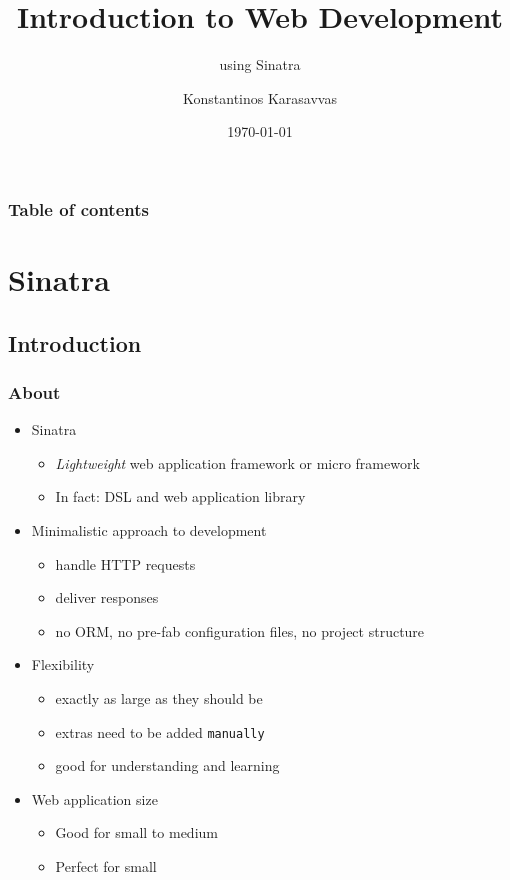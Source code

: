 \documentclass{beamer}
\begin{document}
\title{Introduction to Web Development}
\subtitle{using Sinatra}
\author[Konstantinos Karasavvas]{Konstantinos Karasavvas} %

\date{\today} 

\begin{frame}
  \titlepage
\end{frame}

\begin{frame}
\setcounter{tocdepth}{2}
\frametitle{Table of contents}
\tableofcontents
\end{frame} 





\section{Sinatra}

\subsection{Introduction} 
\begin{frame}\frametitle{About} 
  \begin{itemize}
    \item Sinatra 
    \begin{itemize}
      \item \textit{Lightweight} web application framework or micro framework
      \item In fact: DSL and web application library
    \end{itemize}

    \item Minimalistic approach to development
    \begin{itemize}
      \item handle HTTP requests
      \item deliver responses
      \item no ORM, no pre-fab configuration files, no project structure
    \end{itemize}

    \item Flexibility
    \begin{itemize}
      \item exactly as large as they should be
      \item extras need to be added \texttt{manually}
      \item good for understanding and learning
    \end{itemize}
    
    \item Web application size
    \begin{itemize}
      \item Good for small to medium
      \item Perfect for small 
    \end{itemize}
        
  \end{itemize}
\end{frame}
\end{document}
